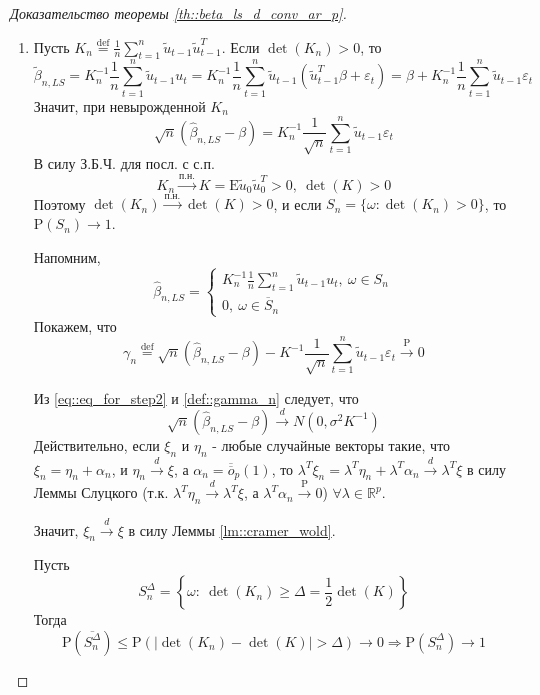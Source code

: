 \documentclass[12pt]{article}
\newcommand*{\defeq}{\stackrel{\text{def}}{=}}
\def\eps{ \varepsilon }
\def\R{ \mathbb{R} }
\def\E{ \mathrm{E} }
\def\P{ \mathrm{P} }
\def\littleO{ \overline{\overline{o}} }
\begin{document}
\begin{proof}[Доказательство теоремы \ref{th::beta_ls_d_conv_ar_p}]
\begin{enumerate}
        \item Пусть $K_n\defeq\frac{1}{n}\sum_{t=1}^n\widetilde{u}_{t-1}\widetilde{u}_{t-1}^T$.
        Если $\det(K_n)>0$, то
        \[\widetilde{\beta}_{n,LS}=K_n^{-1}\frac{1}{n}\sum_{t=1}^n\widetilde{u}_{t-1}u_t=K_n^{-1}\frac{1}{n}\sum_{t=1}^n\widetilde{u}_{t-1}(\widetilde{u}_{t-1}^T\beta+\eps_t)=\beta+K_n^{-1}\frac{1}{n}\sum_{t=1}^n\widetilde{u}_{t-1}\eps_t\]
        Значит, при невырожденной $K_n$
        \[\sqrt{n}(\widehat{\beta}_{n,LS}-\beta)=K_n^{-1}\frac{1}{\sqrt{n}}\sum_{t=1}^n\widetilde{u}_{t-1}\eps_t\]
        В силу З.Б.Ч. для посл. с с.п.
        \[K_n\xrightarrow{\text{п.н.}}K=\E\widetilde{u}_0\widetilde{u}_0^T>0,\ \det(K)>0\] 
        Поэтому $\det(K_n)\xrightarrow{\text{п.н.}}\det(K)>0$, и если $S_n=\{\omega:\det(K_n)>0\}$, то $\P(S_n)\rightarrow1$.

        Напомним,
        \[\widehat{\beta}_{n,LS}=\begin{cases}
            K_n^{-1}\frac{1}{n}\sum_{t=1}^n\widetilde{u}_{t-1}u_t,\ \omega\in S_n \\
            0,\ \omega\in\overline{S}_n
        \end{cases}\]
        Покажем, что
        \begin{equation}\label{def::gamma_n}
            \gamma_n\defeq\sqrt{n}(\widehat{\beta}_{n,LS}-\beta)-K^{-1}\frac{1}{\sqrt{n}}\sum_{t=1}^n\widetilde{u}_{t-1}\eps_t\xrightarrow{\P}0
        \end{equation}
        
        Из \eqref{eq::eq_for_step2} и \eqref{def::gamma_n} следует, что
        \[\sqrt{n}(\widehat{\beta}_{n,LS}-\beta)\xrightarrow{d}N(0,\sigma^2K^{-1})\]
        Действительно, если $\xi_n$ и $\eta_n$ - любые случайные векторы такие, что $\xi_n=\eta_n+\alpha_n$,
        и $\eta_n\xrightarrow{d}\xi$, а $\alpha_n=\littleO_p(1)$, то $\lambda^T\xi_n=\lambda^T\eta_n+\lambda^T\alpha_n\xrightarrow{d}\lambda^T\xi$
        в силу Леммы Слуцкого (т.к. $\lambda^T\eta_n\xrightarrow{d}\lambda^T\xi$, а $\lambda^T\alpha_n\xrightarrow{\P}0$) $\forall\lambda\in\R^p$.

        Значит, $\xi_n\xrightarrow{d}\xi$ в силу Леммы \ref{lm::cramer_wold}.

        Пусть
        \[S_n^\Delta=\left\{\omega:\ \det(K_n)\geq\Delta=\frac{1}{2}\det(K)\right\}\]
        Тогда
        \[\P(\overline{S_n^\Delta})\leq\P(\left\lvert \det(K_n)-\det(K)\right\rvert >\Delta)\rightarrow0\Rightarrow\P(S_n^\Delta)\rightarrow1\]


\end{enumerate}
\end{proof}
\end{document}
